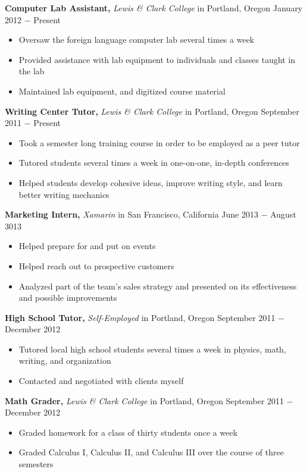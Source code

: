 \documentclass{res} %
\begin{document}
\begin{resume}
{\bf Computer Lab Assistant,} {\it Lewis \& Clark College} in Portland, Oregon \hfill January 2012 $-$ Present %
\begin{itemize}[label={--}]
	\item Oversaw the foreign language computer lab several times a week
	\item Provided assistance with lab equipment to individuals and classes taught in the lab
	\item Maintained lab equipment, and digitized course material
\end{itemize}

{\bf Writing Center Tutor,} {\it Lewis \& Clark College} in Portland, Oregon \hfill September 2011 $-$ Present %
\begin{itemize}[label={--}]
	\item Took a semester long training course in order to be employed as a peer tutor
	\item Tutored students several times a week in one-on-one, in-depth conferences
	\item Helped students develop cohesive ideas, improve writing style, and learn better writing mechanics
\end{itemize}

{\bf Marketing Intern,} {\it Xamarin} in San Francisco, California \hfill June 2013 $-$ August 3013 %
\begin{itemize}[label={--}]
	\item Helped prepare for and put on events
	\item Helped reach out to prospective customers
	\item Analyzed part of the team's sales strategy and presented on its effectiveness and possible improvements
\end{itemize}

{\bf High School Tutor,} {\it Self-Employed} in Portland, Oregon \hfill September 2011 $-$ December 2012 %
\begin{itemize}[label={--}]
	\item Tutored local high school students several times a week in physics, math, writing, and organization
	\item Contacted and negotiated with clients myself
\end{itemize}

{\bf Math Grader,} {\it Lewis \& Clark College} in Portland, Oregon \hfill September 2011 $-$ December 2012 %
\begin{itemize}[label={--}]
	\item Graded homework for a class of thirty students once a week
	\item Graded Calculus I, Calculus II, and Calculus III over the course of three semesters
\end{itemize}


\end{resume}
\end{document}

